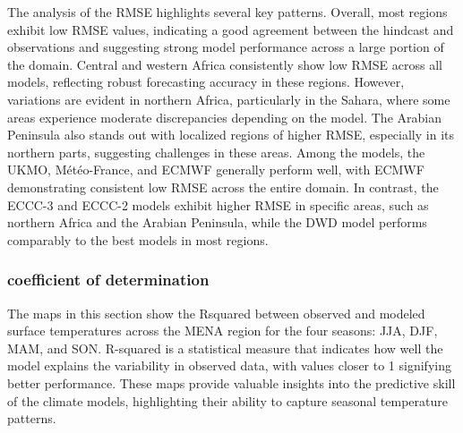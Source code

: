 The analysis of the RMSE highlights several key patterns. Overall, most regions exhibit low RMSE values, indicating a good agreement between the hindcast and observations and suggesting strong model performance across a large portion of the domain. Central and western Africa consistently show low RMSE across all models, reflecting robust forecasting accuracy in these regions. However, variations are evident in northern Africa, particularly in the Sahara, where some areas experience moderate discrepancies depending on the model. The Arabian Peninsula also stands out with localized regions of higher RMSE, especially in its northern parts, suggesting challenges in these areas. Among the models, the UKMO, Météo-France, and ECMWF generally perform well, with ECMWF demonstrating consistent low RMSE across the entire domain. In contrast, the ECCC-3 and ECCC-2 models exhibit higher RMSE in specific areas, such as northern Africa and the Arabian Peninsula, while the DWD model performs comparably to the best models in most regions. 

\subsubsection{coefficient of determination}


The maps in this section show the Rsquared between observed and modeled surface temperatures across the MENA region for the four seasons: JJA, DJF, MAM, and SON. R-squared is a statistical measure that indicates how well the model explains the variability in observed data, with values closer to 1 signifying better performance. These maps provide valuable insights into the predictive skill of the climate models, highlighting their ability to capture seasonal temperature patterns.

